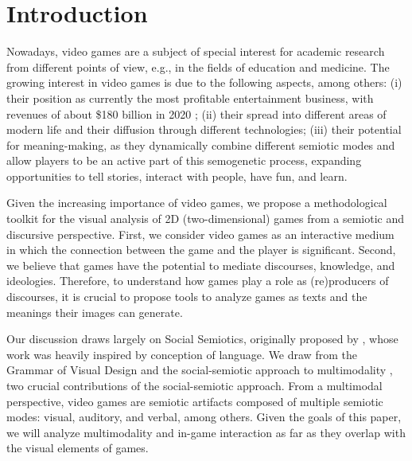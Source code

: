 \documentclass[english]{textolivre}
\begin{document}
\begin{polyabstract}
\begin{portuguese}
\begin{abstract}
\end{abstract}
\end{portuguese}
\end{polyabstract}

\section{Introduction}\label{sec-intro}
Nowadays, video games are a subject of special interest for academic research from different points of view, e.g., in the fields of education and medicine. The growing interest in video games is due to the following aspects, among others: (i) their position as currently the most profitable entertainment business, with revenues of about \$180 billion in 2020 \cite{witkowski_videogames_2021}; (ii) their spread into different areas of modern life and their diffusion through different technologies; (iii) their potential for meaning-making, as they dynamically combine different semiotic modes and allow players to be an active part of this semogenetic process, expanding opportunities to tell stories, interact with people, have fun, and learn.

Given the increasing importance of video games, we propose a methodological toolkit for the visual analysis of 2D (two-dimensional) games from a semiotic and discursive perspective. First, we consider video games as an interactive medium in which the connection between the game and the player is significant. Second, we believe that games have the potential to mediate discourses, knowledge, and ideologies. Therefore, to understand how games play a role as (re)producers of discourses, it is crucial to propose tools to analyze games as texts \cite[p. 6 et seq.]{fernandez-vara_introduction_2019} and the meanings their images can generate.

Our discussion draws largely on Social Semiotics, originally proposed by \textcite{hodge_social_1988}, whose work was heavily inspired by  conception of language. We draw from the Grammar of Visual Design \cite{kress_reading_2020}
and the social-semiotic approach to multimodality \cite{kress_multimodal_2001,van_leeuwen_introducing_2005}, two crucial contributions of the social-semiotic approach. From a multimodal perspective, video games are semiotic artifacts composed of multiple semiotic modes: visual, auditory, and verbal, among others. Given the goals of this paper, we will analyze multimodality and in-game interaction as far as they overlap with the visual elements of games.
\end{document}
